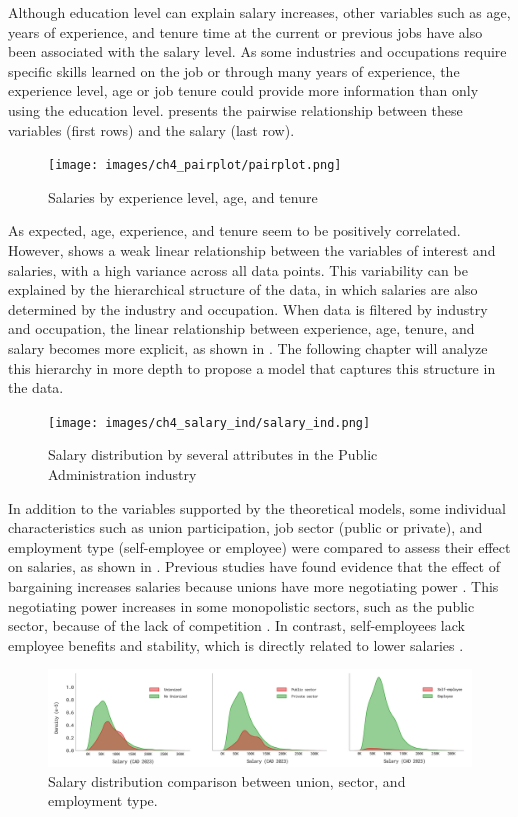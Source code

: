 Although education level can explain salary increases, other variables such as age, years of experience, and tenure time at the current or previous jobs have also been associated with the salary level. As some industries and occupations require specific skills learned on the job or through many years of experience, the experience level, age or job tenure could provide more information than only using the education level.  presents the pairwise relationship between these variables (first rows) and the salary (last row). 

\begin{figure}[!h]
    \centering
    \texttt{[image: images/ch4\_pairplot/pairplot.png]}
    \setlength{\abovecaptionskip}{-10pt}
    \caption{Salaries by experience level, age, and tenure}
    \label{fig:salary_pairplot}
\end{figure}

As expected, age, experience, and tenure seem to be positively correlated. However,  shows a weak linear relationship between the variables of interest and salaries, with a high variance across all data points. This variability can be explained by the hierarchical structure of the data, in which salaries are also determined by the industry and occupation. When data is filtered by industry and occupation, the linear relationship between experience, age, tenure, and salary becomes more explicit, as shown in . The following chapter will analyze this hierarchy in more depth to propose a model that captures this structure in the data.

\begin{figure}[!h]
    \centering
    \texttt{[image: images/ch4\_salary\_ind/salary\_ind.png]}
    \setlength{\abovecaptionskip}{-10pt}
    \caption{Salary distribution by several attributes in the Public Administration industry }
    \label{fig:salary_ind}
\end{figure}

In addition to the variables supported by the theoretical models, some individual characteristics such as union participation, job sector (public or private), and employment type (self-employee or employee) were compared to assess their effect on salaries, as shown in . Previous studies have found evidence that the effect of bargaining increases salaries because unions have more negotiating power \citep{Gregg1986,Mcdonald1992}. This negotiating power increases in some monopolistic sectors, such as the public sector, because of the lack of competition \citep{Gunderson1979}. In contrast, self-employees lack employee benefits and stability, which is directly related to lower salaries \citep{Hamilton2000}.

\begin{figure}[!h]
    \centering
    \includegraphics[width=1.0\textwidth]{images/ch4_other_fields/other_fields.png}
    \setlength{\abovecaptionskip}{-10pt}
    \caption{Salary distribution comparison between union, sector, and employment type. }
    \label{fig:other_fields}
\end{figure}